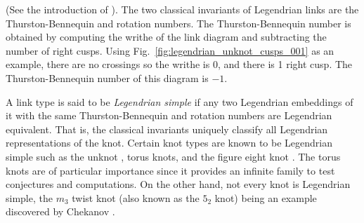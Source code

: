 \documentclass{article}
\theoremstyle{plain}
\begin{document}
        (See the introduction of \cite{VeraVertessiTransNonSimpleKnots}). The
        two classical invariants of Legendrian links are the Thurston-Bennequin
        and rotation numbers. The Thurston-Bennequin number is obtained by
        computing the writhe of the link diagram and subtracting the number of
        right cusps. Using Fig.~\ref{fig:legendrian_unknot_cusps_001} as an
        example, there are no crossings so the writhe is 0, and there is 1 right
        cusp. The Thurston-Bennequin number of this diagram is $-1$.
        \par\hfill\par
        A link type is said to be \textit{Legendrian simple} if
        any two Legendrian embeddings of it with the same Thurston-Bennequin
        and rotation numbers are Legendrian equivalent. That is, the classical
        invariants uniquely classify all Legendrian representations of the knot.
        Certain knot types are known to be Legendrian simple such as the unknot
        \cite{EliashbergFraserClassificationTopTrivialLegKnots}, torus knots,
        and the figure eight knot \cite{EtnyreHondaContactTopologyI}. The torus
        knots are of particular importance since it provides an infinite
        family to test conjectures and computations. On the other hand,
        not every knot is Legendrian simple, the $m_{3}$ twist knot (also
        known as the $5_{2}$ knot) being an example discovered by Chekanov
        \cite{ChekanovDifAlgOfLegLinks}.
\end{document}
